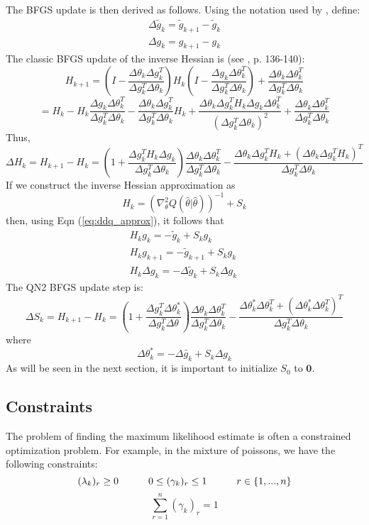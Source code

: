\documentclass[letter,12pt]{article}
\begin{document}
The BFGS update is then derived as follows.  Using the notation used by \cite{jamshidianj97}, define:
\[
\begin{array}{l}
\Delta \tilde{g}_k = \tilde{g}_{k+1} - \tilde{g}_{k} \\
\Delta g_k = g_{k+1} - g_k
\end{array}
\]
The classic BFGS update of the inverse Hessian is (see \cite{nocedalwright_BFGS}, p. 136-140):
\[
H_{k+1} = (I - \frac{\Delta \theta_k\Delta g_k^T}{\Delta g_k^T\Delta \theta_k})H_k(I-\frac{\Delta g_k\Delta \theta_k^T}{\Delta g_k^T\Delta \theta_k})+\frac{\Delta \theta_k\Delta \theta_k^T}{\Delta g_k^T\Delta \theta_k}
\]
\[
= H_k - H_k\frac{\Delta g_k\Delta \theta_k^T}{\Delta g_k^T\Delta \theta_k} - \frac{\Delta \theta_k\Delta g_k^T}{\Delta g_k^T\Delta \theta_k}H_k + \frac{\Delta \theta_k\Delta g_k^TH_k\Delta g_k\Delta \theta_k^T}{(\Delta g_k^T\Delta \theta_k)^2}+\frac{\Delta \theta_k\Delta \theta_k^T}{\Delta g_k^T\Delta \theta_k}
\]
Thus,
\[
\Delta H_k = H_{k+1} - H_k
= (1+\frac{\Delta g_k^TH_k\Delta g_k}{\Delta g_k^T\Delta \theta_k})\frac{\Delta \theta_k\Delta \theta_k^T}{\Delta g_k^T\Delta \theta_k} - \frac{\Delta \theta_k\Delta g_k^TH_k + (\Delta \theta_k\Delta g_k^TH_k)^T}{\Delta g_k^T\Delta \theta_k}
\]
If we construct the inverse Hessian approximation as
\[
H_k = (\nabla^2_{\theta}Q(\hat{\theta}|\hat{\theta}))^{-1} + S_k
\]
then, using Eqn (\ref{eq:ddq_approx}), it follows that
\[\begin{array}{c}
H_k  g_k =  -\tilde{g}_k + S_kg_k
\\
H_k  g_{k+1} = -\tilde{g}_{k+1} + S_kg_k
\\
H_k \Delta g_k = -\Delta \tilde{g}_k + S_k\Delta g_k
\end{array}\
\]
The QN2 BFGS update step is:
\begin{equation} \label{eq:BFGS}
\Delta S_k = H_{k+1} - H_k =
\left(
1 + \frac{\Delta g_k^T \Delta \theta_k^*}{\Delta g_k^T \Delta \theta}
\right)
\frac{\Delta \theta_k \Delta \theta_k^T}{\Delta g_k^T \Delta \theta_k}
-
\frac{\Delta \theta_k^* \Delta \theta_k^T + (\Delta \theta_k^* \Delta \theta_k^T)^T}{\Delta g_k^T \Delta \theta_k}
\end{equation}
where
\[
\Delta \theta_k^* = -\Delta \tilde{g_k} + S_k \Delta g_k
\]
As will be seen in the next section, it is important to initialize $S_0$ to $\boldsymbol{0}$.


\subsection{Constraints}
The problem of finding the maximum likelihood estimate is often a constrained optimization problem.  For example, in the mixture of poissons, we have the following constraints:
\[
(\lambda_k)_r \geq 0 \indent \indent
0 \leq (\gamma_k)_r \leq 1 \indent \indent
r \in \{1,...,n\}
\]
\begin{equation} \label{eqn:equalityconstraint}
\sum_{r=1}^{n} (\gamma_k)_r = 1
\end{equation}
\end{document}
